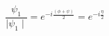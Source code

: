 \begin{equation}
\frac{\psi_1}{\mid \psi_1\mid } = e^{-i \frac{(\phi + \psi)}{2}} = e^{-i \frac{\eta}{2}}  \label{eq:altmisbir}
\end{equation}

